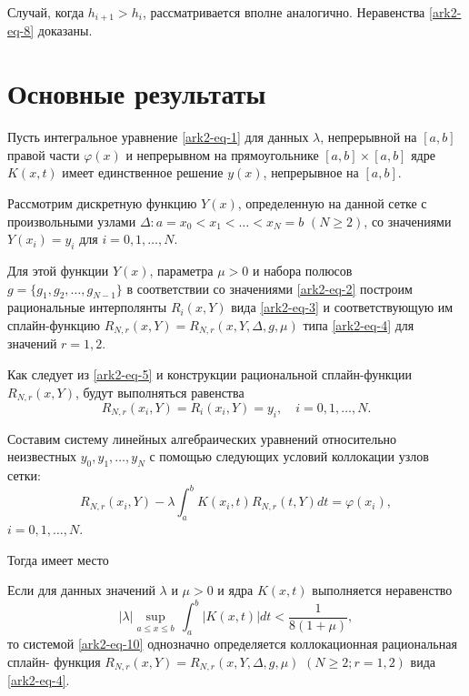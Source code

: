 Случай, когда $h_{i+1}>h_i$, рассматривается вполне аналогично. Неравенства
\eqref{ark2-eq-8} доказаны.


\section{Основные результаты}

Пусть интегральное уравнение \eqref{ark2-eq-1} для данных $\lambda$, непрерывной
на $[a,b]$ правой части $\varphi(x)$ и непрерывном на прямоугольнике $[a,b]\times [a,b]$
ядре $K(x,t)$ имеет единственное решение $y(x)$, непрерывное на $[a,b]$.

Рассмотрим дискретную функцию $Y(x)$, определенную на данной сетке с произвольными узлами
$\Delta: a=x_0<x_1<\dots<x_N=b$ $(N\geqslant 2)$, со значениями
$Y(x_i)=y_i$ для $i=0,1,\dots,N$.

Для этой функции $Y(x)$, параметра $\mu>0$ и набора полюсов $g=\{g_1,g_2,\dots,g_{N-1}\}$
в соответствии со значениями \eqref{ark2-eq-2} построим рациональные интерполянты $R_i(x,Y)$ вида \eqref{ark2-eq-3}
и соответствующую им сплайн-функцию
$R_{N,r}(x,Y)=R_{N,r}(x,Y,\Delta,g,\mu)$ типа \eqref{ark2-eq-4} для значений $r=1,2$.

Как следует из \eqref{ark2-eq-5} и конструкции рациональной сплайн-функции $R_{N,r}(x,Y)$,
будут выполняться равенства
\begin{equation}\label{ark2-eq-9}
R_{N,r}(x_i,Y)=R_i(x_i,Y)=y_i,\quad i=0,1,\dots,N.
\end{equation}

Составим систему линейных алгебраических уравнений относительно неизвестных
$y_0,y_1,\dots,y_N$ с помощью следующих условий коллокации узлов сетки:
\begin{equation}\label{ark2-eq-10}
R_{N,r}(x_i,Y)-\lambda \int_a^b K(x_i,t)R_{N,r}(t,Y)dt=\varphi(x_i),
\end{equation}
$i=0,1,\dots,N$.

Тогда имеет место

\begin{theorem}\label{teor1}
Если для данных значений $\lambda$ и $\mu>0$ и ядра $K(x,t)$ выполняется неравенство
\begin{equation}\label{ark2-eq-11}
|\lambda| \sup_{a\leqslant x\leqslant b} \,\int_a^b |K(x,t)|dt<\frac 1{8(1+\mu)},
\end{equation}
то системой \eqref{ark2-eq-10} однозначно определяется коллокационная рациональная сплайн- функция
$R_{N,r}(x,Y)=R_{N,r}(x,Y,\Delta,g,\mu)$ $(N\geqslant 2; r=1,2)$ вида \eqref{ark2-eq-4}.
 \end{theorem}

